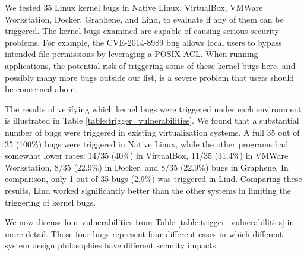 We tested 35 Linux kernel bugs in Native Linux, VirtualBox, VMWare
Workstation, Docker, Graphene, 
and Lind, to evaluate if any of them can be triggered. The kernel bugs
examined 
are capable of causing serious security problems. For example, 
the CVE-2014-8989 bug allows local users to bypass intended file
permissions by leveraging a POSIX ACL. 
When running applications, the potential risk of triggering some of these
kernel bugs here, 
and possibly many more bugs outside our list, is a severe problem that
users should be concerned about.

The results of verifying which kernel bugs were triggered under each
environment is illustrated in Table \ref{table:trigger_vulnerabilities}. 
We found that a substantial number of bugs were triggered in existing
virtualization systems. 
A full 35 out of 35 (100\%) bugs were triggered in Native Linux, 
while the other programs had somewhat lower rates: 14/35 (40\%) in
VirtualBox, 
11/35 (31.4\%)  in VMWare Workstation, 8/35 (22.9\%)  in Docker, and 8/35
(22.9\%) bugs in Graphene. 
In comparison, only 1 out of 35 bugs  (2.9\%)  was triggered in Lind. 
Comparing these results, Lind worked significantly better than the other
systems in limiting the triggering of kernel bugs.

We now discuss four vulnerabilities from Table \ref{table:trigger_vulnerabilities} 
in more detail. Those four bugs represent four different cases in which 
different system design philosophies have different security impacts. 

